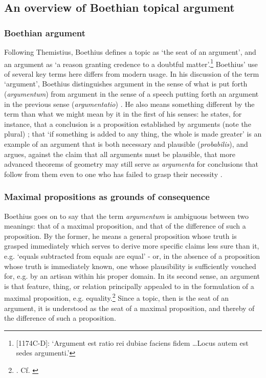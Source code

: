 \documentclass[a4paper, 11pt]{article}
\begin{document}
\subsection{An overview of Boethian topical argument}
\subsubsection{Boethian argument}
Following Themistius, Boethius defines a topic as `the seat of an argument', and an argument as `a reason granting credence to a doubtful matter'.\footnote{[1174C-D]\autocite{BDT}: `Argument est ratio rei dubiae faciens fidem \ldots Locus autem est sedes argumenti.'} Boethius' use of several key terms here differs from modern usage. In his discussion of the term `argument', Boethius distinguishes argument in the sense of what is put forth (\emph{argumentum}) from argument in the sense of a speech putting forth an argument in the previous sense (\emph{argumentatio}) \autocite[1174C]{BDT}. He also means something different by the term than what we might mean by it in the first of his senses: he states, for instance, that a conclusion is a proposition established by arguments (note the plural) \autocite[1180C]{BDT}; that `if something is added to any thing, the whole is made greater' is an example of an argument that is both necessary and plausible (\emph{probabilis}), and argues, against the claim that all arguments must be plausible, that more advanced theorems of geometry may still serve as \emph{argumenta} for conclusions that follow from them even to one who has failed to grasp their necessity \autocite[1181A-C]{BDT}. 

\subsubsection{Maximal propositions as grounds of consequence}
Boethius goes on to say that the term \emph{argumentum} is ambiguous between two meanings: that of a maximal proposition, and that of the difference of such a proposition. By the former, he means a general proposition whose truth is grasped immediately which serves to derive more specific claims less sure than it, e.g. `equals subtracted from equals are equal' - or, in the absence of a proposition whose truth is immediately known, one whose plausibility is sufficiently vouched for, e.g. by an artisan within his proper domain. In its second sense, an argument is that feature, thing, or relation principally appealed to in the formulation of a maximal proposition, e.g. equality.\footnote{\autocite[1185A-B]{BDT}. Cf. \autocite{Holopainen2007,Archambault2017e}} Since a topic, then is the seat of an argument, it is understood as the seat of a maximal proposition, and thereby of the difference of such a proposition. 
\end{document}

